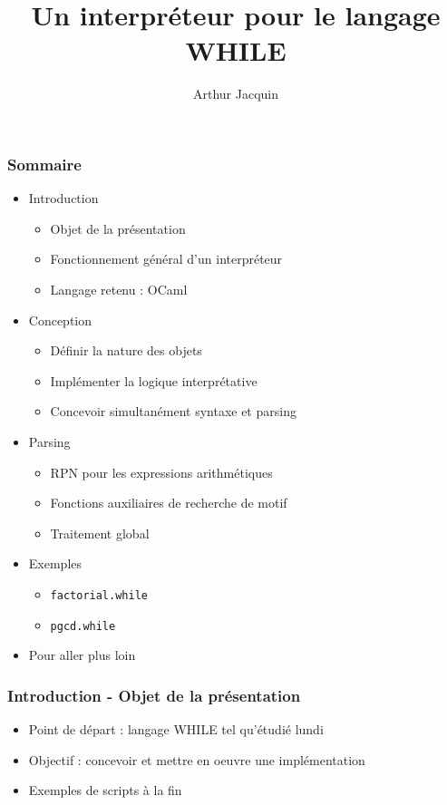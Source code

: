 \documentclass{beamer}
\title{Un interpréteur pour le langage WHILE}
\author{Arthur Jacquin}
\date{}
\begin{document}
\frame{\titlepage}

\begin{frame}
\frametitle{Sommaire}
\begin{itemize}
\item Introduction
    \begin{itemize}
    \item Objet de la présentation
    \item Fonctionnement général d'un interpréteur
    \item Langage retenu : OCaml
    \end{itemize}
\item Conception
    \begin{itemize}
    \item Définir la nature des objets
    \item Implémenter la logique interprétative
    \item Concevoir simultanément syntaxe et parsing
    \end{itemize}
\item Parsing
    \begin{itemize}
    \item RPN pour les expressions arithmétiques
    \item Fonctions auxiliaires de recherche de motif
    \item Traitement global
    \end{itemize}
\item Exemples
    \begin{itemize}
    \item \texttt{factorial.while}
    \item \texttt{pgcd.while}
    \end{itemize}
\item Pour aller plus loin
\end{itemize}
\end{frame}

\begin{frame}
\frametitle{Introduction - Objet de la présentation}
\begin{itemize}
\item Point de départ : langage WHILE tel qu'étudié lundi
\item Objectif : concevoir et mettre en oeuvre une implémentation
\item Exemples de scripts à la fin
\end{itemize}
\end{frame}
\end{document}
